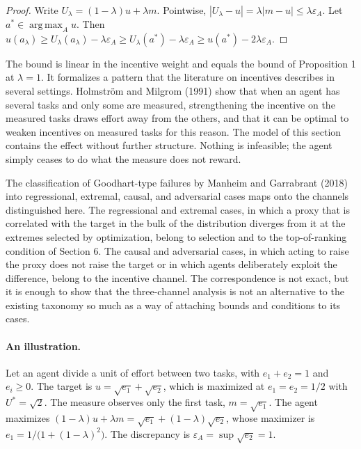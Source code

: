 \documentclass[11pt]{article}
\theoremstyle{remark}
\newcommand{\argmax}{\operatorname*{arg\,max}}
\begin{document}
\begin{proof}
Write $U_\lambda=(1-\lambda)u+\lambda m$. Pointwise, $|U_\lambda-u|=\lambda|m-u|\le\lambda\varepsilon_A$. Let $a^\ast\in\argmax_A u$. Then $u(a_\lambda)\ge U_\lambda(a_\lambda)-\lambda\varepsilon_A\ge U_\lambda(a^\ast)-\lambda\varepsilon_A\ge u(a^\ast)-2\lambda\varepsilon_A$.
\end{proof}

The bound is linear in the incentive weight and equals the bound of Proposition 1 at $\lambda=1$. It formalizes a pattern that the literature on incentives describes in several settings. Holmstr\"om and Milgrom (1991) show that when an agent has several tasks and only some are measured, strengthening the incentive on the measured tasks draws effort away from the others, and that it can be optimal to weaken incentives on measured tasks for this reason. The model of this section contains the effect without further structure. Nothing is infeasible; the agent simply ceases to do what the measure does not reward.

The classification of Goodhart-type failures by Manheim and Garrabrant (2018) into regressional, extremal, causal, and adversarial cases maps onto the channels distinguished here. The regressional and extremal cases, in which a proxy that is correlated with the target in the bulk of the distribution diverges from it at the extremes selected by optimization, belong to selection and to the top-of-ranking condition of Section 6. The causal and adversarial cases, in which acting to raise the proxy does not raise the target or in which agents deliberately exploit the difference, belong to the incentive channel. The correspondence is not exact, but it is enough to show that the three-channel analysis is not an alternative to the existing taxonomy so much as a way of attaching bounds and conditions to its cases.

\paragraph{An illustration.} Let an agent divide a unit of effort between two tasks, with $e_1+e_2=1$ and $e_i\ge0$. The target is $u=\sqrt{e_1}+\sqrt{e_2}$, which is maximized at $e_1=e_2=1/2$ with $U^\ast=\sqrt2$. The measure observes only the first task, $m=\sqrt{e_1}$. The agent maximizes $(1-\lambda)u+\lambda m=\sqrt{e_1}+(1-\lambda)\sqrt{e_2}$, whose maximizer is $e_1=1/\bigl(1+(1-\lambda)^2\bigr)$. The discrepancy is $\varepsilon_A=\sup\sqrt{e_2}=1$.
\end{document}
